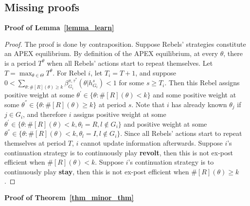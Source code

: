 \documentclass[12pt,letter]{article}
\newtheorem*{theorem*}{Theorem}
\newtheorem*{lemma*}{Lemma}
\theoremstyle{definition}
\theoremstyle{remark}
\theoremstyle{claim}
\begin{document}
\clearpage
\subsection{Missing proofs}
\noindent\textbf{Proof of Lemma~\ref{lemma_learn}}
\begin{proof}
The proof is done by contraposition. Suppose Rebels' strategies constitute an APEX equilibrium. By definition of the APEX equilibrium, at every $\theta$, there is a period $T^{\theta}$ when all Rebels' actions start to repeat themselves. Let $T=\max_{\theta\in \Theta}{T^{\theta}}$. For Rebel $i$, let $T_i=T+1$, and suppose $0<\sum_{\theta:\#[R](\theta)\geq k}\beta^{\pi,\tau^*}_{G_i}(\theta|h^{s}_{G_i})<1$ for some $s\geq T_i$. Then this Rebel assigns positive weight at some ${\theta^{'}}\in \{\theta:\#[R](\theta)< k\}$ and some positive weight at some ${\theta^{''}}\in \{\theta:\#[R](\theta)\geq k\}$ at period $s$. Note that $i$ has already known $\theta_j$ if $j\in G_i$, and therefore $i$ assigns positive weight at some $\theta^{'}\in \{\theta:\#[R](\theta)< k, \theta_l=R, l\notin G_i\}$ and positive weight at some $\theta^{''}\in \{\theta:\#[R](\theta)< k, \theta_l=I, l\notin G_i\}$. Since all Rebels' actions start to repeat themselves at period $T$, $i$ cannot update information afterwards. Suppose $i$'s continuation strategy is to continuously play \textbf{revolt}, then this is not ex-post efficient when $\#[R](\theta)< k$. Suppose $i$'s continuation strategy is to continuously play \textbf{stay}, then this is not ex-post efficient when $\#[R](\theta)\geq k$.
\end{proof}
%
%
\bigskip
\noindent\textbf{Proof of Theorem~\ref{thm_minor_thm}}
\end{document}
